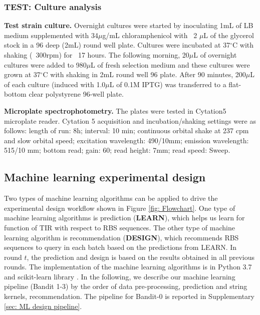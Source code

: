 \subsubsection{TEST: Culture analysis}

\textbf{Test strain culture.}
Overnight cultures were started by inoculating 1mL of LB medium supplemented with 34$\mu$g/mL chloramphenicol with ~2 $\mu$L of the glycerol stock in a 96 deep (2mL) round well plate.
Cultures were incubated at 37$^{\circ}$C with shaking (~300rpm) for ~17 hours. 
The following morning, 20$\mu$L of overnight cultures were added to 980$\mu$L of fresh selection medium and these cultures were grown at 37$^{\circ}$C with shaking in 2mL round well 96 plate. 
After 90 minutes, 200$\mu$L of each culture (induced with 1.0$\mu$L of 0.1M IPTG) was transferred to a flat-bottom clear polystyrene 96-well plate.

\textbf{Microplate spectrophotometry.}
The plates were tested in Cytation5 microplate reader.
Cytation 5 acquisition and incubation/shaking settings were as follows: length of run: 8h; interval: 10 min; continuous orbital shake at 237 cpm and slow orbital speed; excitation wavelength: 490/10mm; emission wavelength: 515/10 mm; bottom read; gain: 60; read height: 7mm; read speed: Sweep.

\subsection{Machine learning experimental design}

Two types of machine learning algorithms can be applied to drive the experimental design workflow shown in Figure \ref{fig: Flowchart}.
One type of machine learning algorithms is prediction (\textbf{LEARN}), which helps us learn for function of TIR with respect to RBS sequences. The other type of machine learning algorithm is recommendation (\textbf{DESIGN}), which recommends RBS sequences to query in each batch based on the predictions from LEARN. 
In round $t$, the prediction and design is based on the results obtained in all previous rounds. 
The implementation of the machine learning algorithms is in Python 3.7 and scikit-learn library \cite{scikit-learn}. 
In the following, we describe our machine learning pipeline (Bandit 1-3) by the order of data pre-processing, prediction and string kernels, recommendation. 
The pipeline for Bandit-0 is reported in Supplementary \ref{sec: ML design pipeline}.

